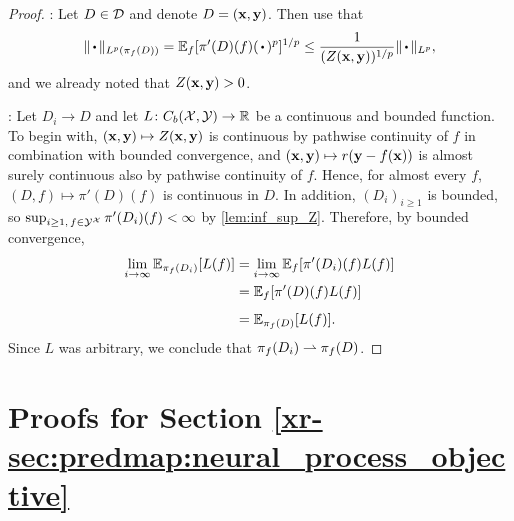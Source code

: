 \documentclass[12pt, twoside]{report}
\newcommand{\xrprefix}[1]{xr-#1}
\begin{document}
\begin{proof}
    :
    Let $D \in \mathcal{D}$ and denote $D = (\mathbf{x}, \mathbf{y})$.
    Then use that
    \begin{equation}
        \norm{\vardot}_{L^p(\pi_f(D))}
        = \E_f[\pi'(D)(f)(\vardot)^p]^{1/p}
        \le \frac{1}{(Z(\vx, \vy))^{1/p}} \norm{\vardot}_{L^p},
    \end{equation}
    and we already noted that $Z(\mathbf{x}, \mathbf{y}) > 0$.

    :
    Let $D_i \to D$ and let $L\colon C_b(\mathcal{X}, \mathcal{Y}) \to \mathbb{R}$ be a continuous and bounded function.
    To begin with, $(\mathbf{x}, \mathbf{y}) \mapsto Z(\mathbf{x}, \mathbf{y})$ is continuous by pathwise continuity of $f$ in combination with bounded convergence, and $(\mathbf{x}, \mathbf{y}) \mapsto r(\mathbf{y} - f(\mathbf{x}))$ is almost surely continuous also by pathwise continuity of $f$.
    Hence, for almost every $f$, $(D, f) \mapsto \pi'(D)(f)$ is continuous in $D$.
    In addition, $(D_i)_{i \ge 1}$ is bounded, so
    $\operatorname*{sup}_{i \ge 1,\, f \in \mathcal{Y}^{\mathcal{X}}} \pi'(D_i)(f) < \infty$
    by \cref{lem:inf_sup_Z}.
    Therefore, by bounded convergence,
    \begin{align}
        \lim_{i \to \infty} \E_{\pi_f(D_i)}[L(f)]
        &= \lim_{i \to \infty} \E_{f}[\pi'(D_i)(f)L(f)] \\
        &= \vphantom{\lim_{i \to \infty}}\E_{f}[ \pi'(D)(f)L(f)] \\
        &= \E_{\pi_f(D)}[L(f)].
    \end{align}
    Since $L$ was arbitrary, we conclude that $\pi_f(D_i) \rightharpoonup \pi_f(D)$.
\end{proof}

\section{Proofs for Section \ref{\xrprefix{sec:predmap:neural_process_objective}}}
\label{sec:proofs_predmap:neural_process_objective}
\end{document}
